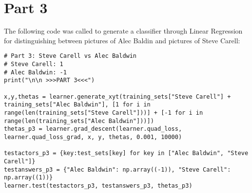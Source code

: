 \documentclass[11pt,a4paper]{report}
\begin{document}
\section*{Part 3}
The following code was called to generate a classifier through Linear Regression for distinguishing between pictures of Alec Baldin and pictures of Steve Carell:

\begin{lstlisting}
# Part 3: Steve Carell vs Alec Baldwin
# Steve Carell: 1
# Alec Baldwin: -1
print("\n\n >>>PART 3<<<")

x,y,thetas = learner.generate_xyt(training_sets["Steve Carell"] + training_sets["Alec Baldwin"], [1 for i in range(len(training_sets["Steve Carell"]))] + [-1 for i in range(len(training_sets["Alec Baldwin"]))])
thetas_p3 = learner.grad_descent(learner.quad_loss, learner.quad_loss_grad, x, y, thetas, 0.001, 10000)

testactors_p3 = {key:test_sets[key] for key in ["Alec Baldwin", "Steve Carell"]}
testanswers_p3 = {"Alec Baldwin": np.array((-1)), "Steve Carell": np.array((1))}
learner.test(testactors_p3, testanswers_p3, thetas_p3)
\end{lstlisting}
\end{document}
